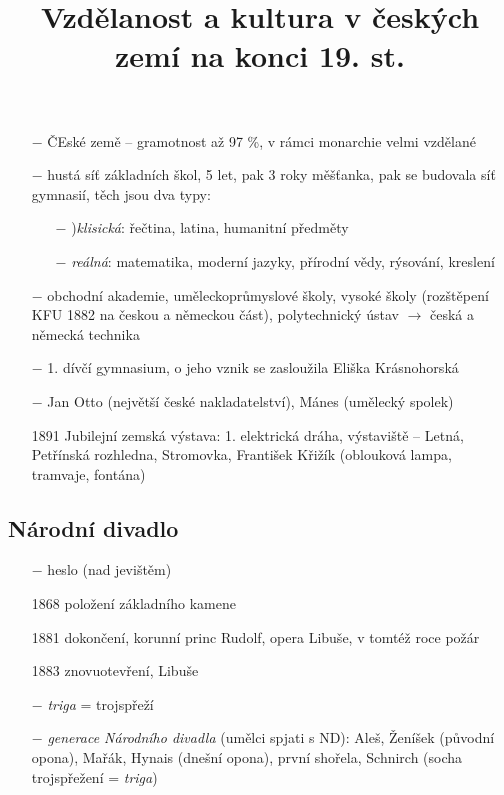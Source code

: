\documentclass{article}
\title{\vspace{-2cm}Vzdělanost a kultura v českých zemí na konci 19. st.\vspace{-1.7cm}}
\date{}
\author{}
\begin{document}
\maketitle

\begin{itemize}
    \vspace{-0.5em}
    \setlength\itemsep{0.15em}
    \item[$-$] ČEské země -- gramotnost až 97 \%, v rámci monarchie velmi vzdělané
    \item[$-$] hustá síť základních škol, 5 let, pak 3 roky měšťanka, pak se budovala síť gymnasií, těch jsou dva typy:
    \begin{itemize}
        \vspace{-0.5em}
        \setlength\itemsep{0.15em}
        \item[$-$] )\textit{klisická}:  řečtina, latina, humanitní předměty
        \item[$-$] \textit{reálná}: matematika, moderní jazyky, přírodní vědy, rýsování, kreslení
    \end{itemize}
    \item[$-$] obchodní akademie, uměleckoprůmyslové školy, vysoké školy (rozštěpení KFU 1882 na českou a německou část), polytechnický ústav $\rightarrow$  česká a německá technika
    \item[$-$] 1. dívčí gymnasium, o jeho vznik se zasloužila Eliška Krásnohorská
    \item[$-$] Jan Otto (největší české nakladatelství), Mánes (umělecký spolek)
    \item[1891] Jubilejní zemská výstava: 1. elektrická dráha, výstaviště -- Letná, Petřínská rozhledna, Stromovka, František Křižík (oblouková lampa, tramvaje, fontána)
\end{itemize}

\subsection*{Národní divadlo}
\begin{itemize}
    \vspace{-0.5em}
    \setlength\itemsep{0.15em}
    \item[$-$] heslo  (nad jevištěm)
    \item[1868] položení základního kamene
    \item[1881] dokončení, korunní princ Rudolf, opera Libuše, v tomtéž roce požár
    \item[1883] znovuotevření, Libuše
    \item[$-$] \textit{triga} = trojspřeží
    \item[$-$] \textit{generace Národního divadla} (umělci spjati s ND): Aleš, Ženíšek (původní opona), Mařák, Hynais (dnešní opona), první shořela, Schnirch (socha trojspřežení = \textit{triga})
\end{itemize}
\end{document}
